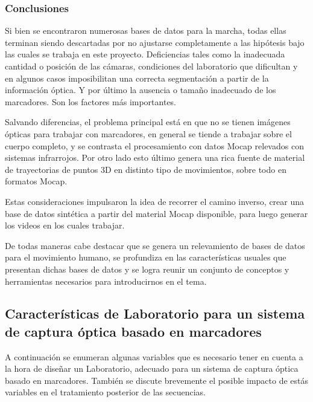 \subsubsection{Conclusiones}\label{conclusiones_revision_base_datos} 

Si bien se encontraron numerosas bases de datos para la marcha, todas ellas terminan siendo descartadas por no ajustarse completamente a las hipótesis bajo las cuales se trabaja en este proyecto. Deficiencias tales como la inadecuada cantidad o posición de las cámaras, condiciones del laboratorio que dificultan y en algunos casos imposibilitan una correcta segmentación a partir de la información óptica. Y por último la ausencia o tamaño inadecuado de los marcadores. Son los factores más importantes.


Salvando diferencias, el problema principal está en que no se tienen imágenes ópticas para trabajar con marcadores, en general se tiende a trabajar sobre el cuerpo completo, y se contrasta el procesamiento con datos Mocap relevados con sistemas infrarrojos. Por otro lado esto último genera una rica fuente de material de trayectorias de puntos 3D en distinto tipo de movimientos, sobre todo en formatos Mocap.



Estas consideraciones impulsaron la idea de recorrer el camino inverso, crear una base de datos sintética a partir del material Mocap disponible, para luego generar los videos en los cuales trabajar.  


De todas maneras cabe destacar que se genera un relevamiento de bases de datos para el movimiento humano, se profundiza en las características usuales que presentan dichas bases de datos y se logra reunir un conjunto de conceptos y herramientas necesarios para introducirnos en el tema. 



\subsection{Características de Laboratorio para un sistema de captura óptica basado en marcadores}
\label{seccion_Caracteristicas_Laboratorio}
 
A continuación se enumeran algunas variables que es necesario tener en cuenta a la hora de diseñar un Laboratorio, adecuado para un sistema de captura óptica basado en marcadores. También se discute brevemente el posible impacto de estás variables en el tratamiento posterior de las secuencias.

